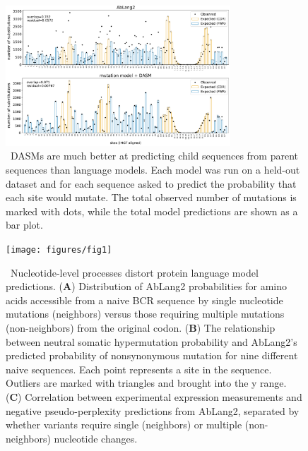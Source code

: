 \documentclass{article}
\begin{document}
\begin{figure}[ht]
\centering
\centerline{\includegraphics[width=0.75\textwidth]{figures/sites-oe-rodriguez}}
\caption{\
DASMs are much better at predicting child sequences from parent sequences than language models.
Each model was run on a held-out dataset and for each sequence asked to predict the probability that each site would mutate.
The total observed number of mutations is marked with dots, while the total model predictions are shown as a bar plot.
}%
\label{fig:selFactorsAndPerplexity}
\end{figure}

\begin{figure}[h!]
\centering
\centerline{\texttt{[image: figures/fig1]}}
\caption{\
Nucleotide-level processes distort protein language model predictions.
(\textbf{A}) Distribution of AbLang2 probabilities for amino acids accessible from a naive BCR sequence by single nucleotide mutations (neighbors) versus those requiring multiple mutations (non-neighbors) from the original codon.
(\textbf{B}) The relationship between neutral somatic hypermutation probability and AbLang2's predicted probability of nonsynonymous mutation for nine different naive sequences. Each point represents a site in the sequence.
Outliers are marked with triangles and brought into the y range.
(\textbf{C}) Correlation between experimental expression measurements and negative pseudo-perplexity predictions from AbLang2, separated by whether variants require single (neighbors) or multiple (non-neighbors) nucleotide changes.
}%
\label{fig:ntProcessInLLMs}
\end{figure}
\end{document}
